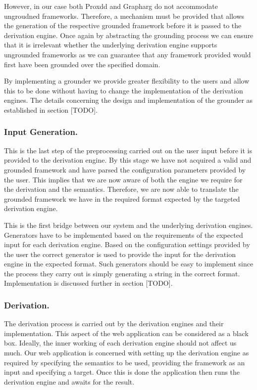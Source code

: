 However, in our case both Proxdd and Grapharg do not accommodate ungroudned frameworks. Therefore, a mechanism must be provided that allows the generation of the respective grounded framework before it is passed to the derivation engine. Once again by abstracting the grounding process we can ensure that it is irrelevant whether the underlying derivation engine supports ungrounded frameworks as we can guarantee that any framework provided would first have been grounded over the specified domain.

By implementing a grounder we provide greater flexibility to the users and allow this to be done without having to change the implementation of the derivation engines. The details concerning the design and implementation of the grounder as established in section [TODO].

\subsubsection{Input Generation.}
This is the last step of the preprocessing carried out on the user input before it is provided to the derivation engine. By this stage we have not acquired a valid and grounded framework and have parsed the configuration parameters provided by the user. This implies that we are now aware of both the engine we require for the derivation and the semantics. Therefore, we are now able to translate the grounded framework we have in the required format expected by the targeted derivation engine.

This is the first bridge between our system and the underlying derivation engines. Generators have to be implemented based on the requirements of the expected input for each derivation engine. Based on the configuration settings provided by the user the correct generator is used to provide the input for the derivation engine in the expected format. Such generators should be easy to implement since the process they carry out is simply generating a string in the correct format. Implementation is discussed further in section [TODO].

\subsubsection{Derivation.}
The derivation process is carried out by the derivation engines and their implementation. This aspect of the web application can be considered as a black box. Ideally, the inner working of each derivation engine should not affect us much. Our web application is concerned with setting up the derivation engine as required by specifying the semantics to be used, providing the framework as an input and specifying a target. Once this is done the application then runs the derivation engine and awaits for the result.


